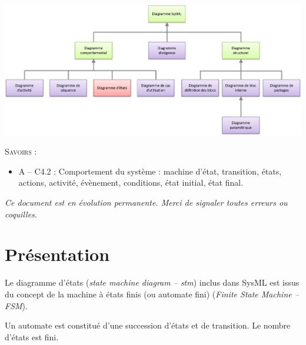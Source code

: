 \documentclass[10pt]{article}
\begin{document}





\begin{center}
\includegraphics[width=.95\textwidth]{images/stm} 
\end{center}

\vspace{.2cm}

%

\begin{savoir}
\textsc{Savoirs :}
\begin{itemize}
\item A -- C4.2 : Comportement du système : machine d’état, transition, états, actions, activité, évènement, conditions, état initial, état final.
\end{itemize}
\end{savoir}

\setlength{\parskip}{0ex plus 0.2ex minus 0ex}
 \renewcommand{\contentsname}{}
 \renewcommand{\baselinestretch}{1}

\tableofcontents

 \renewcommand{\baselinestretch}{1.2}
\setlength{\parskip}{2ex plus 0.5ex minus 0.2ex}

\textit{Ce document est en évolution permanente. Merci de signaler toutes
erreurs ou coquilles.}

\section{Présentation}
\begin{rem}
Le diagramme d'états (\textit{state machine diagram -- stm}) inclus dans SysML est issus du concept de la machine à états finis (ou automate fini) (\textit{Finite State Machine -- FSM}). 

Un automate est constitué d'une succession d'états et de transition. Le nombre d'états est fini. 
\end{rem}
\end{document}
